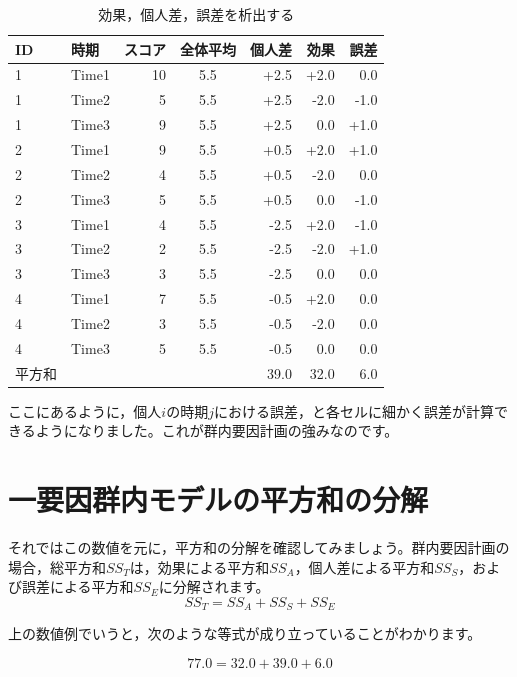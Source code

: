 \documentclass{ltjbook}
\begin{document}
\begin{table}[h]
	\centering
	\caption{効果，個人差，誤差を析出する}
	\begin{tabular}{llrcrrr}
		\hline
		ID  & 時期    & スコア & 全体平均 & 個人差  & 効果   & 誤差   \\
		\hline
		1   & Time1 & 10  & 5.5  & +2.5 & +2.0 & 0.0  \\
		1   & Time2 & 5   & 5.5  & +2.5 & -2.0 & -1.0 \\
		1   & Time3 & 9   & 5.5  & +2.5 & 0.0  & +1.0 \\
		2   & Time1 & 9   & 5.5  & +0.5 & +2.0 & +1.0 \\
		2   & Time2 & 4   & 5.5  & +0.5 & -2.0 & 0.0  \\
		2   & Time3 & 5   & 5.5  & +0.5 & 0.0  & -1.0 \\
		3   & Time1 & 4   & 5.5  & -2.5 & +2.0 & -1.0 \\
		3   & Time2 & 2   & 5.5  & -2.5 & -2.0 & +1.0 \\
		3   & Time3 & 3   & 5.5  & -2.5 & 0.0  & 0.0  \\
		4   & Time1 & 7   & 5.5  & -0.5 & +2.0 & 0.0  \\
		4   & Time2 & 3   & 5.5  & -0.5 & -2.0 & 0.0  \\
		4   & Time3 & 5   & 5.5  & -0.5 & 0.0  & 0.0  \\
		\hline\hline
		平方和 &       &     &      & 39.0 & 32.0 & 6.0  \\\hline
	\end{tabular}
	\label{tbl:21_03}
\end{table}

ここにあるように，個人$i$の時期$j$における誤差，と各セルに細かく誤差が計算できるようになりました。これが群内要因計画の強みなのです。

\section{一要因群内モデルの平方和の分解}

それではこの数値を元に，平方和の分解を確認してみましょう。群内要因計画の場合，総平方和$SS_T$は，効果による平方和$SS_A$，個人差による平方和$SS_S$，および誤差による平方和$SS_E$に分解されます。
\[ SS_T = SS_A + SS_S + SS_E \]

上の数値例でいうと，次のような等式が成り立っていることがわかります。

\[ 77.0 = 32.0 + 39.0 + 6.0 \]
\end{document}
